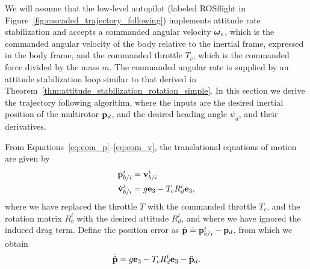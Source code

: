 We will assume that the low-level autopilot (labeled ROSflight in Figure~\ref{fig:cascaded_trajectory_following}) implements attitude rate stabilization and accepts a commanded angular velocity $\boldsymbol{\omega}_c$, which is the commanded angular velocity of the body relative to the inertial frame, expressed in the body frame, and the commanded throttle $T_c$, which is the commanded force divided by the mass $m$.
The commanded angular rate is supplied by an attitude stabilization loop similar to that derived in Theorem~\ref{thm:attitude_stabilization_rotation_simple}.  
In this section we derive the trajectory following algorithm, where the inputs are the desired inertial position of the multirotor $\mathbf{p}_d$, and the desired heading angle $\psi_d$, and their derivatives.

From Equations~\eqref{eq:eom_p}--\eqref{eq:eom_v}, the translational equations of motion are given by
\begin{align}
	\dot{\pbf}_{b/i}^i &= \vbf_{b/i}^i \label{eq:following_pdot_1} \\
	\dot{\vbf}_{b/i}^i &= g \ebf_3 - T_c R_d^i \ebf_3, \label{eq:following_vdot_1}
\end{align}
where we have replaced the throttle $T$ with the commanded throttle $T_c$, and the rotation matrix $R_b^i$ with the desired attitude $R_d^i$, and where we have ignored the induced drag term.
Define the position error as $\tilde{\mathbf{p}} \doteq \mathbf{p}_{b/i}^i - \mathbf{p}_d$, from which we obtain
\begin{equation} \label{eq:cascaded_pddot}
\ddot{\tilde{\pbf}} = g \ebf_3 - T_cR_d^i \ebf_3 - \ddot{\pbf}_d.
\end{equation}

